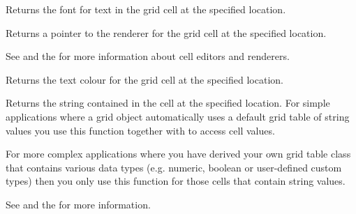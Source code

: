
Returns the font for text in the grid cell at the specified location.



\label{wxgridgetcellrenderer}


Returns a pointer to the renderer for the grid cell at the specified location.

See  and
the  for more information about cell editors and renderers.



\label{wxgridgetcelltextcolour}


Returns the text colour for the grid cell at the specified location.



\label{wxgridgetcellvalue}



Returns the string contained in the cell at the specified location. For simple applications where a
grid object automatically uses a default grid table of string values you use this function together
with  to access cell values.

For more complex applications where you have derived your own grid table class that contains
various data types (e.g. numeric, boolean or user-defined custom types) then you only use this
function for those cells that contain string values.

See 
and the  for more information.



\label{wxgridgetcolleft}




